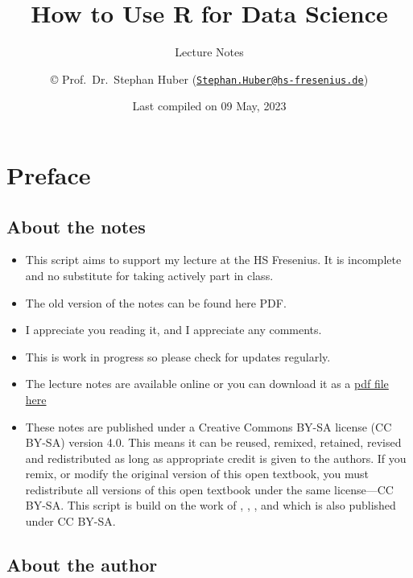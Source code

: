 \documentclass[
  12pt,
  oneside]{book}
\title{How to Use R for Data Science}
\subtitle{Lecture Notes}
\author{© Prof.~Dr.~Stephan Huber (\href{mailto:Stephan.Huber@hs-fresenius.de}{\nolinkurl{Stephan.Huber@hs-fresenius.de}})}
\date{Last compiled on 09 May, 2023}
\providecommand{\tightlist}{%
  \setlength{\itemsep}{0pt}\setlength{\parskip}{0pt}}
\theoremstyle{definition}
\theoremstyle{definition}
\theoremstyle{definition}
\theoremstyle{definition}
\theoremstyle{remark}
\begin{document}
\maketitle

{
\hypersetup{linkcolor=}
\setcounter{tocdepth}{2}
\tableofcontents
}
\hypertarget{preface}{%
\chapter*{Preface}\label{preface}}

\hypertarget{about-the-notes}{%
\section*{About the notes}\label{about-the-notes}}

\begin{itemize}
\tightlist
\item
  This script aims to support my lecture at the HS Fresenius. It is incomplete and no substitute for taking actively part in class.
\item
  The old version of the notes can be found here PDF.
\item
  I appreciate you reading it, and I appreciate any comments.
\item
  This is work in progress so please check for updates regularly.
\item
  The lecture notes are available online or you can download it as a \href{https://raw.githubusercontent.com/hubchev/hubchev.github.io/main/ds/_main.pdf}{pdf file here}
\item
  These notes are published under a Creative Commons BY-SA license (CC BY-SA) version 4.0. This means it can be reused, remixed, retained, revised and redistributed as long as appropriate credit is given to the authors. If you remix, or modify the original version of this open textbook, you must redistribute all versions of this open textbook under the same license---CC BY-SA. This script is build on the work of \citet{Navarro2020Learning}, \citet{Muschelli2022Introduction}, \citet{Thulin2021Modern}, and \citet{Ismay2022Statistical} which is also published under CC BY-SA.
\end{itemize}

\hypertarget{about-the-author}{%
\section*{About the author}\label{about-the-author}}
\end{document}
